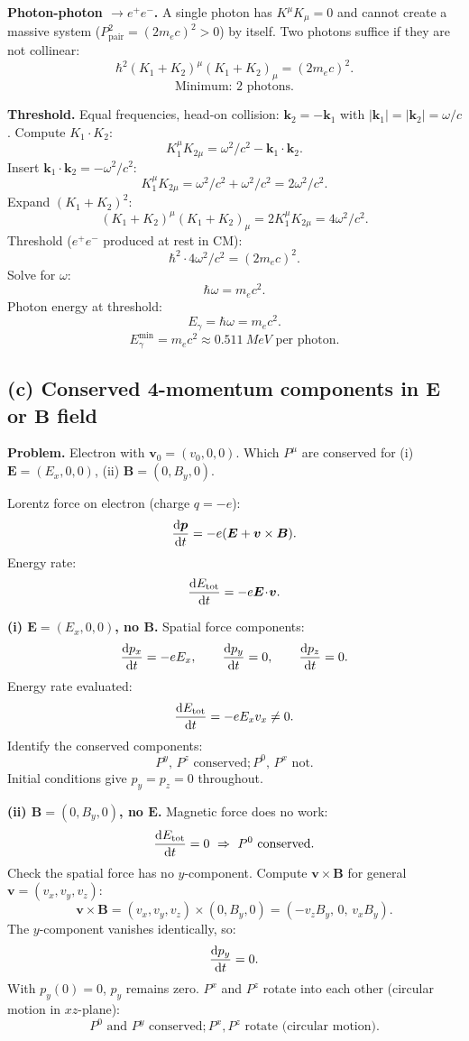 \documentclass[11pt]{article}
\begin{document}
\noindent\textbf{Photon-photon $\to e^+e^-$.} A single photon has $K^\mu K_\mu=0$ and cannot create a massive system ($P_{\text{pair}}^2=(2m_e c)^2>0$) by itself. Two photons suffice if they are not collinear:
\[ \hbar^2(K_1+K_2)^\mu (K_1+K_2)_\mu = (2m_e c)^2. \]
\[ \boxed{\;\text{Minimum: }2\text{ photons.}\;} \]

\noindent\textbf{Threshold.} Equal frequencies, head-on collision: $\bm k_2 = -\bm k_1$ with $|\bm k_1|=|\bm k_2|=\omega/c$. Compute $K_1\!\cdot\!K_2$:
\[ K_1^\mu K_{2\mu} = \omega^2/c^2 - \bm k_1\!\cdot\!\bm k_2. \]
Insert $\bm k_1\!\cdot\!\bm k_2 = -\omega^2/c^2$:
\[ K_1^\mu K_{2\mu} = \omega^2/c^2 + \omega^2/c^2 = 2\omega^2/c^2. \]
Expand $(K_1+K_2)^2$:
\[ (K_1+K_2)^\mu (K_1+K_2)_\mu = 2 K_1^\mu K_{2\mu} = 4\omega^2/c^2. \]
Threshold ($e^+e^-$ produced at rest in CM):
\[ \hbar^2\cdot 4\omega^2/c^2 = (2m_e c)^2. \]
Solve for $\omega$:
\[ \hbar\omega = m_e c^2. \]
Photon energy at threshold:
\[ E_\gamma = \hbar\omega = m_e c^2. \]
\[ \boxed{\;E_\gamma^\text{min} = m_e c^2 \approx \SI{0.511}{MeV}\text{ per photon.}\;} \]

\subsection*{(c) Conserved 4-momentum components in $\bm E$ or $\bm B$ field}

\textbf{Problem.} Electron with $\bm v_0=(v_0,0,0)$. Which $P^\mu$ are conserved for (i) $\bm E=(E_x,0,0)$, (ii) $\bm B=(0,B_y,0)$.

Lorentz force on electron (charge $q=-e$):
\[ \dv{\bm p}{t} = -e(\bm E + \bm v\times\bm B). \]
Energy rate:
\[ \dv{E_\text{tot}}{t} = -e\bm E\!\cdot\!\bm v. \]

\textbf{(i) $\bm E=(E_x,0,0)$, no $\bm B$.} Spatial force components:
\[ \dv{p_x}{t} = -eE_x,\qquad \dv{p_y}{t}=0,\qquad \dv{p_z}{t}=0. \]
Energy rate evaluated:
\[ \dv{E_\text{tot}}{t} = -eE_xv_x\neq 0. \]
Identify the conserved components:
\[ \boxed{\;P^y,\, P^z\text{ conserved}; P^0,\,P^x\text{ not.}\;} \]
Initial conditions give $p_y=p_z=0$ throughout.

\textbf{(ii) $\bm B=(0,B_y,0)$, no $\bm E$.} Magnetic force does no work:
\[ \dv{E_\text{tot}}{t}=0\ \Rightarrow\ P^0\text{ conserved.} \]
Check the spatial force has no $y$-component. Compute $\bm v\times\bm B$ for general $\bm v=(v_x,v_y,v_z)$:
\[ \bm v\times\bm B = (v_x,v_y,v_z)\times(0,B_y,0) = (-v_z B_y,\,0,\,v_x B_y). \]
The $y$-component vanishes identically, so:
\[ \dv{p_y}{t} = 0. \]
With $p_y(0)=0$, $p_y$ remains zero. $P^x$ and $P^z$ rotate into each other (circular motion in $xz$-plane):
\[ \boxed{\;P^0\text{ and }P^y\text{ conserved}; P^x,P^z\text{ rotate (circular motion).}\;} \]
\end{document}
